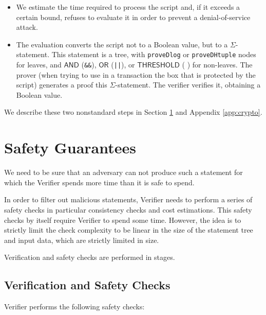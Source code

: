 \documentclass[11pt]{article}
\newcommand{\authnote}[2]{\marginpar{\parbox{\marginparwidth}{\tiny %
  \textsf{#1 {\textcolor{blue}{notes: #2}}}}}%
  \textcolor{blue}{\textbf{\dag}}}
\newcommand{\authnote}[2]{
  \textsf{#1 \textcolor{blue}{: #2}}}
\newcommand{\authnote}[2]{}
\newcommand{\lnote}[1]{{\authnote{\textcolor{orange}{Leo notes}}{#1}}}
\newcommand{\knote}[1]{{\authnote{\textcolor{green}{kushti notes}}{#1}}}
\newcommand{\langname}{ErgoScript\xspace}
\newcommand{\andnode}{\ensuremath{\mathsf{AND}}}
\newcommand{\ornode}{\ensuremath{\mathsf{OR}}}
\newcommand{\tnode}{\ensuremath{\mathsf{THRESHOLD}}}
\begin{document}
\begin{itemize}
\item We estimate the time required to process the script and, if it exceeds a certain bound, refuses to evaluate it in order to prevent a denial-of-service attack.
\item The evaluation converts the script not to a Boolean value, but to a $\Sigma$-statement. This statement is a tree, with  \texttt{proveDlog} or \texttt{proveDHtuple} nodes for leaves, and $\andnode$ (\texttt{\&\&}), $\ornode$ (\texttt{||}), or $\tnode$ (\lnote{insert \langname notation here}) for  non-leaves. The prover (when trying to use in a transaction the box that is protected by the script) generates a proof this $\Sigma$-statement. The verifier verifies it, obtaining a Boolean value.
\end{itemize}

\lnote{Is the above accurate about everything else being relatively standard? Is there anything we want to describe?}

We describe these two nonstandard steps in Section \ref{sec:safety} and Appendix \ref{app:crypto}. \lnote{Should they be both in the appendix or both in the main body?}


\section{Safety Guarantees}
\label{sec:safety}

We need to be sure that an adversary can not produce such a statement for
which the Verifier spends more time than it is safe to spend. \knote{links to
verifier dilemma, orphan rates etc}

In order to filter out malicious statements, Verifier needs to perform a
series of safety checks in particular consistency checks and cost
estimations. This safety checks by itself require Verifier to spend some
time. However, the idea is to strictly limit the check complexity to be
linear in the size of the statement tree and input data, which are strictly
limited in size.

Verification and safety checks are performed in stages.

\subsection{Verification and Safety Checks}
\label{sec:safety-checks}

Verifier performs the following safety checks:
\end{document}
